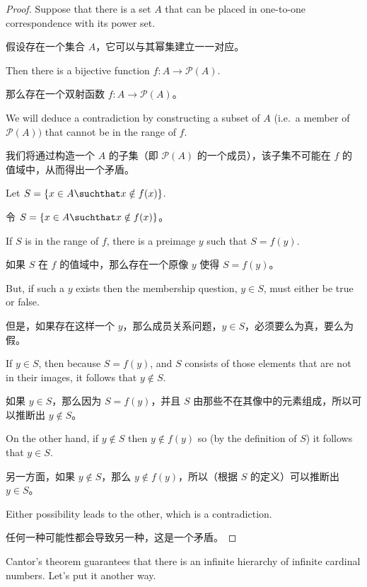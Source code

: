 \begin{proof}
    Suppose that there is a set $A$ that can be placed in one-to-one
    correspondence with its power set.

    假设存在一个集合 $A$，它可以与其幂集建立一一对应。

    Then there is a bijective
    function $f : A \longrightarrow {\mathcal P}(A)$.

    那么存在一个双射函数 $f : A \longrightarrow {\mathcal P}(A)$。

    We will deduce
    a contradiction by constructing a subset of $A$
    (i.e.\ a member of ${\mathcal P}(A))$ that cannot
    be in the range of $f$.

    我们将通过构造一个 $A$ 的子集（即 ${\mathcal P}(A)$ 的一个成员），该子集不可能在 $f$ 的值域中，从而得出一个矛盾。

    Let $S = \{x \in A \suchthat x \notin f(x)\}$.

    令 $S = \{x \in A \suchthat x \notin f(x)\}$。

    If $S$ is in the range of $f$, there is a preimage $y$ such that $S = f(y)$.

    如果 $S$ 在 $f$ 的值域中，那么存在一个原像 $y$ 使得 $S = f(y)$。

    But, if such a $y$ exists then the membership question, $y \in S$, must
    either be true or false.

    但是，如果存在这样一个 $y$，那么成员关系问题，$y \in S$，必须要么为真，要么为假。

    If $y \in S$,  then because $S = f(y)$, and $S$
    consists of those elements that are not in their images, it follows
    that $y \notin S$.

    如果 $y \in S$，那么因为 $S = f(y)$，并且 $S$ 由那些不在其像中的元素组成，所以可以推断出 $y \notin S$。

    On the other hand, if $y \notin S$ then $y \notin f(y)$ so
    (by the definition of $S$) it follows that $y \in S$.

    另一方面，如果 $y \notin S$，那么 $y \notin f(y)$，所以（根据 $S$ 的定义）可以推断出 $y \in S$。

    Either possibility leads to the other, which is a contradiction.

    任何一种可能性都会导致另一种，这是一个矛盾。

\end{proof}

Cantor's theorem guarantees that there is an infinite hierarchy of infinite
cardinal numbers.  Let's put it another way.

